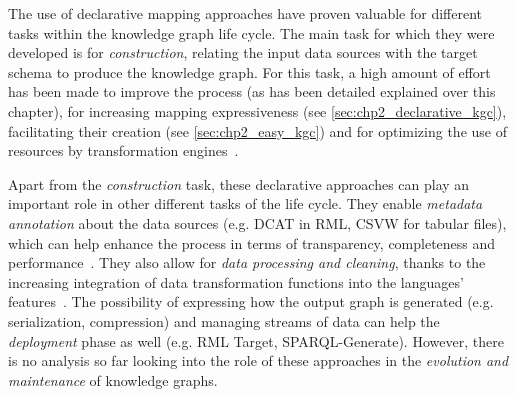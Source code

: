 The use of declarative mapping approaches have proven valuable for different tasks within the knowledge graph life cycle. The main task for which they were developed is for \textit{construction}, relating the input data sources with the target schema to produce the knowledge graph. For this task, a high amount of effort has been made to improve the process (as has been detailed explained over this chapter), for increasing mapping expressiveness (see \cref{sec:chp2_declarative_kgc}), facilitating their creation (see \cref{sec:chp2_easy_kgc}) and for optimizing the use of resources by transformation engines~\parencite{arenas2022morphkgc,iglesias2023scaling,xiao2020virtual,iglesias2022empowering,jozashoori2019mapsdi}. 

Apart from the \textit{construction} task, these declarative approaches can play an important role in other different tasks of the life cycle. They enable \textit{metadata annotation} about the data sources (e.g. DCAT in RML, CSVW for tabular files), which can help enhance the process in terms of transparency, completeness and performance~\parencite{chaves2021morph-csv,vidal2023knowledge}. 
They also allow for \textit{data processing and cleaning}, thanks to the increasing integration of data transformation functions into the languages' features~\parencite{debruyne2016r2rmlf,junior2016funul,jozashoori2020funmap,DeMeester2017fno_dbpedia}.
The possibility of expressing how the output graph is generated (e.g. serialization, compression) and managing streams of data can help the \textit{deployment} phase as well (e.g. RML Target, SPARQL-Generate). However, there is no analysis so far looking into the role of these approaches in the \textit{evolution and maintenance} of knowledge graphs. 



